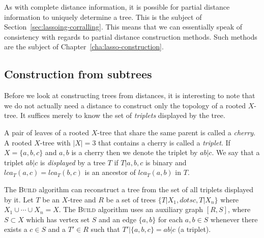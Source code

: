 As with complete distance information, it is possible for partial distance
information to uniquely determine a tree.  This is the subject of
Section~\ref{sec:lassoing-corralling}.  This means that we can essentially
speak of consistency with regards to partial distance construction methods.
Such methods are the subject of Chapter~\ref{cha:lasso-construction}.

\subsection{Construction from subtrees}
\label{sec:constr-from-subtr}

Before we look at constructing trees from distances, it is interesting to note
that we do not actually need a distance to construct only the topology of a
rooted $X$-tree.  It suffices merely to know the set of \textit{triplets}
displayed by the tree.

A pair of leaves of a rooted $X$-tree that share the same parent is called a
\textit{cherry}.  A rooted $X$-tree with $|X| = 3$ that contains a cherry is
called a \textit{triplet}.  If $X = \{a,b,c\}$ and $a,b$ is a cherry then we
denote the triplet by $ab|c$.  We say that a triplet $ab|c$ is
\textit{displayed} by a tree $T$ if $T|{a,b,c}$ is binary and $lca_T(a,c) =
lca_T(b,c)$ is an ancestor of $lca_T(a,b)$ in $T$.

The \textsc{Build} algorithm can reconstruct a tree from the set of all
triplets displayed by it.  Let $T$ be an $X$-tree and $R$ be a set of trees
$\{T|X_1,dotsc,T|X_n\}$ where $X_1 \cup \dotsb \cup X_n = X$.  The
\textsc{Build} algorithm uses an auxiliary graph $[R,S]$, where $S \subset X$
which has vertex set $S$ and an edge $\{a,b\}$ for each $a,b \in S$ whenever
there exists a $c \in S$ and a $T' \in R$ such that $T'|\{a,b,c\} = ab|c$ (a
triplet).

